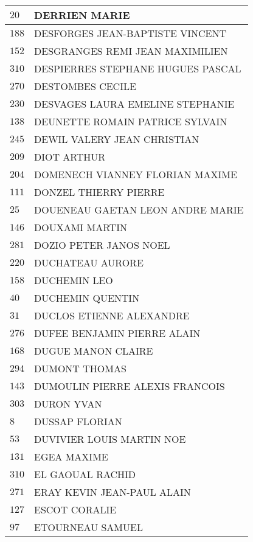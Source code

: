 \begin{xltabular}{\linewidth}{|l|X|}
    \hline
    $20$ & DERRIEN MARIE \\
    \hline
    $188$ & DESFORGES JEAN-BAPTISTE VINCENT \\
    \hline
    $152$ & DESGRANGES REMI JEAN MAXIMILIEN \\
    \hline
    $310$ & DESPIERRES STEPHANE HUGUES PASCAL \\
    \hline
    $270$ & DESTOMBES CECILE \\
    \hline
    $230$ & DESVAGES LAURA EMELINE STEPHANIE \\
    \hline
    $138$ & DEUNETTE ROMAIN PATRICE SYLVAIN \\
    \hline
    $245$ & DEWIL VALERY JEAN CHRISTIAN \\
    \hline
    $209$ & DIOT ARTHUR \\
    \hline
    $204$ & DOMENECH VIANNEY FLORIAN MAXIME \\
    \hline
    $111$ & DONZEL THIERRY PIERRE \\
    \hline
    $25$ & DOUENEAU GAETAN LEON ANDRE MARIE \\
    \hline
    $146$ & DOUXAMI MARTIN \\
    \hline
    $281$ & DOZIO PETER JANOS NOEL \\
    \hline
    $220$ & DUCHATEAU AURORE \\
    \hline
    $158$ & DUCHEMIN LEO \\
    \hline
    $40$ & DUCHEMIN QUENTIN \\
    \hline
    $31$ & DUCLOS ETIENNE ALEXANDRE \\
    \hline
    $276$ & DUFEE BENJAMIN PIERRE ALAIN \\
    \hline
    $168$ & DUGUE MANON CLAIRE \\
    \hline
    $294$ & DUMONT THOMAS \\
    \hline
    $143$ & DUMOULIN PIERRE ALEXIS FRANCOIS \\
    \hline
    $303$ & DURON YVAN \\
    \hline
    $8$ & DUSSAP FLORIAN \\
    \hline
    $53$ & DUVIVIER LOUIS MARTIN NOE \\
    \hline
    $131$ & EGEA MAXIME \\
    \hline
    $310$ & EL GAOUAL RACHID \\
    \hline
    $271$ & ERAY KEVIN JEAN-PAUL ALAIN \\
    \hline
    $127$ & ESCOT CORALIE \\
    \hline
    $97$ & ETOURNEAU SAMUEL \\

\end{xltabular}
